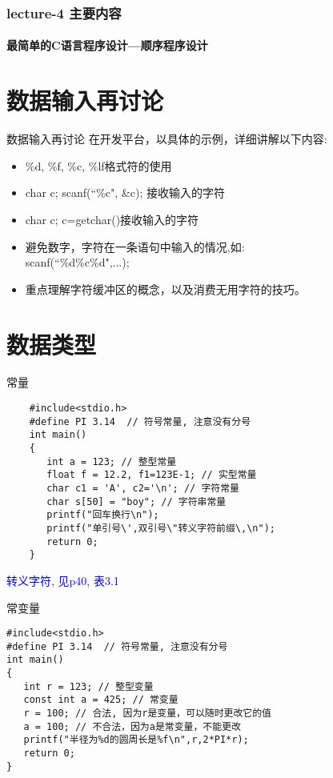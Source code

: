 \begin{frame}
  \frametitle{lecture-4 主要内容}
  \framesubtitle{最简单的C语言程序设计---顺序程序设计}
  \tableofcontents[hideallsubsections]
\end{frame}

\section{数据输入再讨论}

\begin{frame}[fragile]{数据输入再讨论}
在开发平台，以具体的示例，详细讲解以下内容:
\begin{itemize}
	\item \%d, \%f, \%c, \%lf格式符的使用
	\item char c; scanf(``\%c", \&c); 接收输入的字符
	\item char c; c=getchar()接收输入的字符
	\item 避免数字，字符在一条语句中输入的情况,如:\\ scanf(``\%d\%c\%d",...);
	\item 重点理解字符缓冲区的概念，以及消费无用字符的技巧。
\end{itemize}
\end{frame}

\section{数据类型}

\begin{frame}[fragile]{常量}
    \begin{lstlisting}
    #include<stdio.h> 
    #define PI 3.14  // 符号常量, 注意没有分号           
    int main()                   
    {                            
       int a = 123; // 整型常量
       float f = 12.2, f1=123E-1; // 实型常量
       char c1 = 'A', c2='\n'; // 字符常量
       char s[50] = "boy"; // 字符串常量      
       printf("回车换行\n");
       printf("单引号\',双引号\"转义字符前缀\,\n");  
       return 0;           
    }                            
    \end{lstlisting}
    \textcolor{blue}{转义字符, 见p40, 表3.1}
\end{frame}

\begin{frame}[fragile]{常变量}
\begin{lstlisting}
#include<stdio.h> 
#define PI 3.14  // 符号常量, 注意没有分号           
int main()                   
{                            
   int r = 123; // 整型变量
   const int a = 425; // 常变量
   r = 100; // 合法, 因为r是变量，可以随时更改它的值
   a = 100; // 不合法，因为a是常变量，不能更改
   printf("半径为%d的圆周长是%f\n",r,2*PI*r); 
   return 0;           
}                            
\end{lstlisting}
\end{frame}


